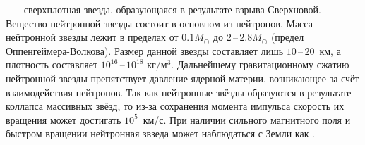 ~--- сверхплотная звезда, образующаяся в результате взрыва Сверхновой. Вещество нейтронной звезды состоит в основном из нейтронов. Масса нейтронной звезды лежит в пределах от $0.1M_{\odot}$ до $2$\,--\,$2.8M_{\odot}$ (предел Оппенгеймера-Волкова). Размер данной звезды составляет лишь $10$\,--\,$20$~км, а плотность составляет $10^{16}$\,--\,$10^{18}$ $\text{кг}/\text{м}^3$.  Дальнейшему гравитационному сжатию нейтронной звезды препятствует давление ядерной материи, возникающее за счёт взаимодействия нейтронов. Так как нейтронные звёзды образуются в результате  коллапса массивных звёзд, то из-за сохранения момента импульса скорость их вращения может достигать $10^5$~км/с. При наличии сильного магнитного поля и быстром вращении нейтронная звзеда может наблюдаться с Земли как .
